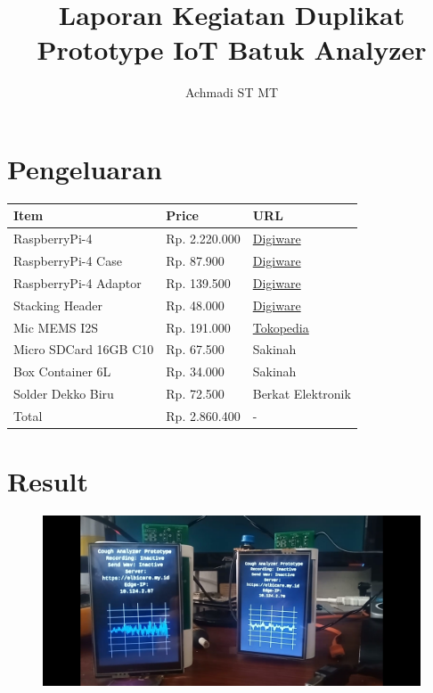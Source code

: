 \documentclass[12pt,]{article}
\title{\Large \bf
	Laporan Kegiatan Duplikat Prototype IoT Batuk Analyzer
}
\author{Achmadi ST MT}
\date{}
\begin{document}
	\maketitle
	\thispagestyle{empty}
	\pagestyle{empty}
	
	\section{Pengeluaran}
	
	\begin{tabular}{|l|l|l|}
		\toprule
		Item & Price & URL \\
		\midrule
		RaspberryPi-4 & Rp. 2.220.000 & \href{https://digiwarestore.com/en/raspberry-board/raspberry-pi-4-ram-2gb-made-in-uk-mini-pc-raspi-4-442339.html}{Digiware} \\
		RaspberryPi-4 Case & Rp. 87.900 & \href{https://digiwarestore.com/en/raspberry-accessories/case-for-raspberry-pi-4-white-abs-with-cooling-fan-and-heat-sink.html}{Digiware} \\
		RaspberryPi-4 Adaptor & Rp. 139.500 & \href{https://digiwarestore.com/en/adaptor/raspberry-pi-4-usb-c-power-supply-5v-3a-644174.html}{Digiware} \\
		Stacking Header & Rp. 48.000 & \href{https://digiwarestore.com/en/pcb-female/header-female-long-pin-stackable-1x10-10-pin-323119.html}{Digiware} \\
		Mic MEMS I2S & Rp. 191.000 & \href{https://www.tokopedia.com/aifrobotic/inmp441-omnidirectional-microphone-module-mems-i2s-interface}{Tokopedia} \\
		Micro SDCard 16GB C10 & Rp. 67.500 & Sakinah \\
		Box Container 6L & Rp. 34.000 & Sakinah \\
		Solder Dekko Biru & Rp. 72.500 & Berkat Elektronik \\
		\midrule
		Total & Rp. 2.860.400 & - \\
		\bottomrule
	\end{tabular}

	\section{Result}
	
	\centering
	\begin{figure}[!ht]
		\centering
		\includegraphics[width=\textwidth,]{images/hasil_duplikat.jpg}
	\end{figure}
\end{document}
